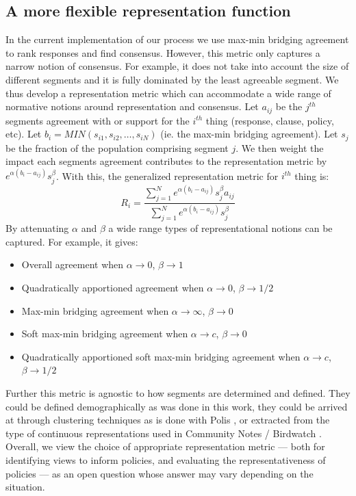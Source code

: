 \documentclass{article}
\begin{document}
\subsection{A more flexible representation function}\label{A:rep metric}
 In the current implementation of our process we use max-min bridging agreement to rank responses and find consensus. However, this metric only captures a narrow notion of consensus. For example, it does not take into account the size of different segments and it is fully dominated by the least agreeable segment. We thus develop a representation metric which can accommodate a wide range of normative notions around representation and consensus. Let $a_{ij}$ be the $j^{th}$ segments agreement with or support for the $i^{th}$ thing (response, clause, policy, etc). Let $ b_i = MIN(s_{i1}, s_{i2}, … , s_{iN}) $ (ie. the max-min bridging agreement). Let $s_j$ be the fraction of the population comprising segment $j$. We then weight the impact each segments agreement contributes to the representation metric by $e^{\alpha(b_i-a_{ij})} s_j^{\beta}$. With this, the generalized representation metric for $i^{th}$ thing is:
\begin{equation}
    R_i = \frac{\sum_{j=1}^N e^{\alpha(b_i-a_{ij})} s_j^{\beta}  a_{ij} }{ \sum_{j=1}^N e^{\alpha(b_i-a_{ij})} s_j^{\beta}}
\end{equation}
By attenuating $\alpha$ and $\beta$ a wide range types of representational notions can be captured. For example, it gives:
\begin{itemize}
    \item Overall agreement when $\alpha\rightarrow0$, $\beta\rightarrow 1$
    \item Quadratically apportioned agreement when $\alpha\rightarrow 0$, $\beta\rightarrow 1/2$
    \item Max-min bridging agreement when $\alpha\rightarrow\infty$, $\beta\rightarrow 0$
    \item Soft max-min bridging agreement when $\alpha\rightarrow c$, $\beta\rightarrow 0$
    \item Quadratically apportioned soft max-min bridging agreement when $\alpha\rightarrow c$, $\beta\rightarrow 1/2$
\end{itemize}
Further this metric is agnostic to how segments are determined and defined. They could be defined demographically as was done in this work, they could be arrived at through clustering techniques as is done with Polis \cite{small2021polis}, or extracted from the type of continuous representations used in Community Notes / Birdwatch \cite{wojcik2022birdwatch}. Overall, we view the choice of appropriate representation metric --- both for identifying views to inform policies, and evaluating the representativeness of policies --- as an open question whose answer may vary depending on the situation. 
\end{document}
